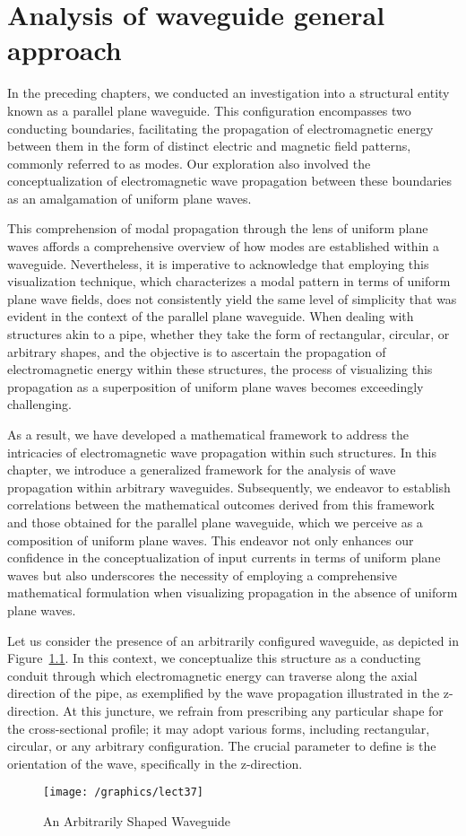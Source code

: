 \chapter{Analysis of waveguide general approach}
In the preceding chapters, we conducted an investigation into a structural entity known as a parallel plane waveguide. This configuration encompasses two conducting boundaries, facilitating the propagation of electromagnetic energy between them in the form of distinct electric and magnetic field patterns, commonly referred to as modes. Our exploration also involved the conceptualization of electromagnetic wave propagation between these boundaries as an amalgamation of uniform plane waves.

This comprehension of modal propagation through the lens of uniform plane waves affords a comprehensive overview of how modes are established within a waveguide. Nevertheless, it is imperative to acknowledge that employing this visualization technique, which characterizes a modal pattern in terms of uniform plane wave fields, does not consistently yield the same level of simplicity that was evident in the context of the parallel plane waveguide. When dealing with structures akin to a pipe, whether they take the form of rectangular, circular, or arbitrary shapes, and the objective is to ascertain the propagation of electromagnetic energy within these structures, the process of visualizing this propagation as a superposition of uniform plane waves becomes exceedingly challenging.

As a result, we have developed a mathematical framework to address the intricacies of electromagnetic wave propagation within such structures. In this chapter, we introduce a generalized framework for the analysis of wave propagation within arbitrary waveguides. Subsequently, we endeavor to establish correlations between the mathematical outcomes derived from this framework and those obtained for the parallel plane waveguide, which we perceive as a composition of uniform plane waves. This endeavor not only enhances our confidence in the conceptualization of input currents in terms of uniform plane waves but also underscores the necessity of employing a comprehensive mathematical formulation when visualizing propagation in the absence of uniform plane waves.

Let us consider the presence of an arbitrarily configured waveguide, as depicted in Figure~\ref{fig:lect37}. In this context, we conceptualize this structure as a conducting conduit through which electromagnetic energy can traverse along the axial direction of the pipe, as exemplified by the wave propagation illustrated in the z-direction. At this juncture, we refrain from prescribing any particular shape for the cross-sectional profile; it may adopt various forms, including rectangular, circular, or any arbitrary configuration. The crucial parameter to define is the orientation of the wave, specifically in the z-direction.
\begin{figure}[h]
\centering
\texttt{[image: /graphics/lect37]}
\caption{An Arbitrarily Shaped Waveguide}
\label{fig:lect37}
\end{figure}
    
